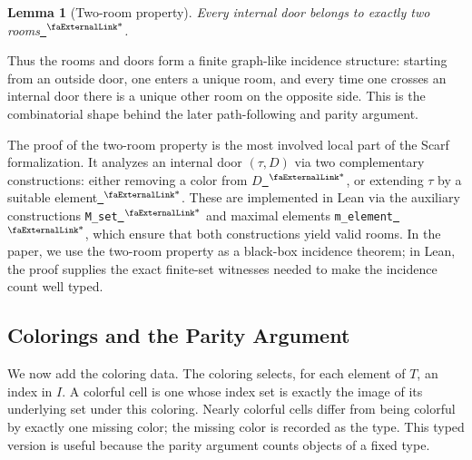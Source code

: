 \documentclass{article}
\newtheorem{lemma}[theorem]{Lemma}
\theoremstyle{definition}
\newcommand{\extlink}{~\ensuremath{{}^\text{\faExternalLink*}}}
\begin{document}
\begin{lemma}[Two-room property]\label{lemma:two-room-property}
Every internal door belongs to exactly two rooms\href{https://github.com/Solo-ary/Game-Theory-Formalization/blob/7b49d5267d4f26b17bdf071250880b63e96999b6/Brouwer/Gametheory/Scarf.lean#L760-L1148}{\extlink}.
\end{lemma}

Thus the rooms and doors form a finite graph-like incidence structure: starting from an outside door, one enters a unique room, and every time one crosses an internal door there is a unique other room on the opposite side. This is the combinatorial shape behind the later path-following and parity argument.

The proof of the two-room property is the most involved local part of the Scarf formalization. It analyzes an internal door $(\tau, D)$ via two complementary constructions: either removing a color from $D$\href{https://github.com/Solo-ary/Game-Theory-Formalization/blob/7b49d5267d4f26b17bdf071250880b63e96999b6/Brouwer/Gametheory/Scarf.lean#L318-L394}{\extlink}, or extending $\tau$ by a suitable element\href{https://github.com/Solo-ary/Game-Theory-Formalization/blob/7b49d5267d4f26b17bdf071250880b63e96999b6/Brouwer/Gametheory/Scarf.lean#L396-L595}{\extlink}. These are implemented in Lean via the auxiliary constructions \verb|M_set|\href{https://github.com/Solo-ary/Game-Theory-Formalization/blob/7b49d5267d4f26b17bdf071250880b63e96999b6/Brouwer/Gametheory/Scarf.lean#L289-L291}{\extlink} and maximal elements \verb|m_element|\href{https://github.com/Solo-ary/Game-Theory-Formalization/blob/7b49d5267d4f26b17bdf071250880b63e96999b6/Brouwer/Gametheory/Scarf.lean#L297-L316}{\extlink}, which ensure that both constructions yield valid rooms. In the paper, we use the two-room property as a black-box incidence theorem; in Lean, the proof supplies the exact finite-set witnesses needed to make the incidence count well typed.

\subsection{Colorings and the Parity Argument}\label{subsec:scarf-colorings}

We now add the coloring data. The coloring selects, for each element of $T$, an index in $I$. A colorful cell is one whose index set is exactly the image of its underlying set under this coloring. Nearly colorful cells differ from being colorful by exactly one missing color; the missing color is recorded as the type. This typed version is useful because the parity argument counts objects of a fixed type.
\end{document}
